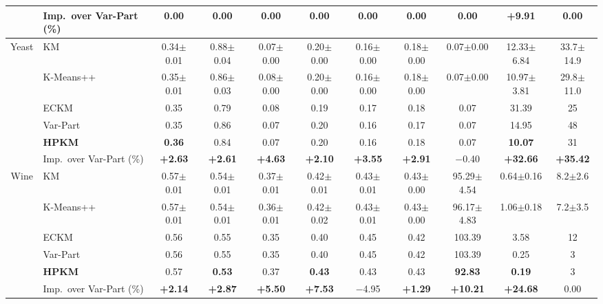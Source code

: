 \begin{table}[p]
\begin{adjustbox}{max width=\textwidth, max totalheight=0.85\textheight}
\begin{tabular}{|c|l|ccccccccc|}
& Imp.\ over Var-Part (\%) & 0.00 & 0.00 & 0.00 & 0.00 & 0.00 & 0.00 & 0.00 & \textbf{+9.91} & 0.00 \\
\hline
Yeast & KM & 0.34$\pm$0.01 & 0.88$\pm$0.04 & 0.07$\pm$0.00 & 0.20$\pm$0.00 & 0.16$\pm$0.00 & 0.18$\pm$0.00 & 0.07$\pm$0.00 & 12.33$\pm$6.84 & 33.7$\pm$14.9 \\
 & K-Means++ & 0.35$\pm$0.01 & 0.86$\pm$0.03 & 0.08$\pm$0.00 & 0.20$\pm$0.00 & 0.16$\pm$0.00 & 0.18$\pm$0.00 & 0.07$\pm$0.00 & 10.97$\pm$3.81 & 29.8$\pm$11.0 \\
 & ECKM & 0.35 & 0.79 & 0.08 & 0.19 & 0.17 & 0.18 & 0.07 & 31.39 & 25 \\
 & Var-Part & 0.35 & 0.86 & 0.07 & 0.20 & 0.16 & 0.17 & 0.07 & 14.95 & 48 \\
 & \textbf{HPKM} & \textbf{0.36} & 0.84 & 0.07 & 0.20 & 0.16 & 0.18 & 0.07 & \textbf{10.07} & 31 \\
& Imp.\ over Var-Part (\%) & \textbf{+2.63} & \textbf{+2.61} & \textbf{+4.63} & \textbf{+2.10} & \textbf{+3.55} & \textbf{+2.91} & $-$0.40 & \textbf{+32.66} & \textbf{+35.42} \\
\hline
Wine & KM & 0.57$\pm$0.01 & 0.54$\pm$0.01 & 0.37$\pm$0.01 & 0.42$\pm$0.01 & 0.43$\pm$0.01 & 0.43$\pm$0.00 & 95.29$\pm$4.54 & 0.64$\pm$0.16 & 8.2$\pm$2.6 \\
 & K-Means++ & 0.57$\pm$0.01 & 0.54$\pm$0.01 & 0.36$\pm$0.01 & 0.42$\pm$0.02 & 0.43$\pm$0.01 & 0.43$\pm$0.00 & 96.17$\pm$4.83 & 1.06$\pm$0.18 & 7.2$\pm$3.5 \\
 & ECKM & 0.56 & 0.55 & 0.35 & 0.40 & 0.45 & 0.42 & 103.39 & 3.58 & 12 \\
 & Var-Part & 0.56 & 0.55 & 0.35 & 0.40 & 0.45 & 0.42 & 103.39 & 0.25 & 3 \\
 & \textbf{HPKM} & 0.57 & \textbf{0.53} & 0.37 & \textbf{0.43} & 0.43 & 0.43 & \textbf{92.83} & \textbf{0.19} & 3 \\
& Imp.\ over Var-Part (\%) & \textbf{+2.14} & \textbf{+2.87} & \textbf{+5.50} & \textbf{+7.53} & $-$4.95 & \textbf{+1.29} & \textbf{+10.21} & \textbf{+24.68} & 0.00 \\
\hline
\end{tabular}
\end{adjustbox}
\end{table}

